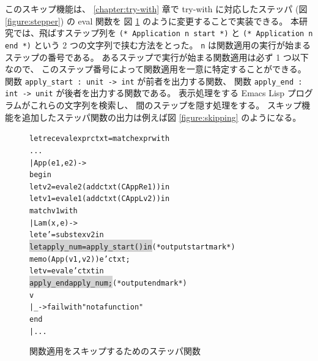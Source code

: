 このスキップ機能は、
\ref{chapter:try-with} 章で try-with に対応したステッパ
(図 \ref{figure:stepper}) の eval 関数を
図 \ref{figure:skipapp} のように変更することで実装できる。
本研究では、飛ばすステップ列を
\texttt{(* Application n start *)} と \texttt{(* Application n end *)}
という 2 つの文字列で挟む方法をとった。
\texttt{n} は関数適用の実行が始まるステップの番号である。
あるステップで実行が始まる関数適用は必ず 1 つ以下なので、
このステップ番号によって関数適用を一意に特定することができる。
関数 \texttt{apply\_start :\ unit -> int} が前者を出力する関数、
関数 \texttt{apply\_end : int -> unit} が後者を出力する関数である。
表示処理をする Emacs Lisp プログラムがこれらの文字列を検索し、
間のステップを隠す処理をする。
スキップ機能を追加したステッパ関数の出力は例えば図 \ref{figure:skipping} のようになる。

\begin{figure}
\begin{alltt}
let rec eval expr ctxt = match expr with
    ...
  | App (e1, e2) ->
    begin
      let v2 = eval e2 (add ctxt (CAppR e1)) in
      let v1 = eval e1 (add ctxt (CAppL v2)) in
      match v1 with
      | Lam (x, e) ->
        let e' = subst e x v2 in
        \colorbox{lightgray}{let apply_num = apply_start () in}                (* output start mark *)
        memo (App (v1, v2)) e' ctxt;
        let v = eval e' ctxt in
        \colorbox{lightgray}{apply_end apply_num;}                               (* output end mark *)
        v
      | _ -> failwith "not a function"
    end
  | ...
\end{alltt}
\caption{関数適用をスキップするためのステッパ関数}
\label{figure:skipapp}
\end{figure}

